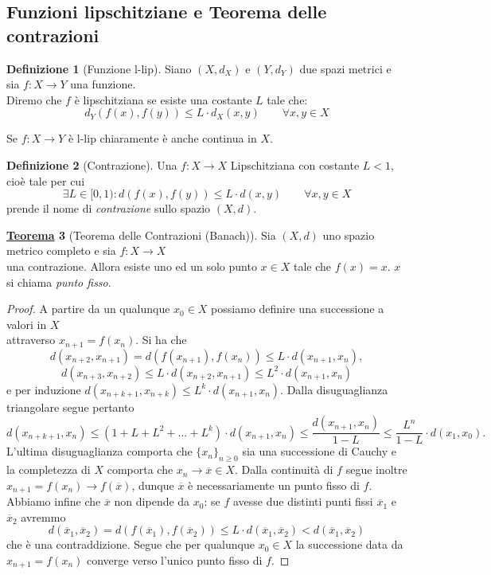 \documentclass[a4paper,twoside]{article}
\theoremstyle{definition}
\newtheorem{theorem}{\color{Red}\underline{\textrm Teorema}}
\newtheorem{definizione}[theorem]{Definizione}
\numberwithin{theorem}{section}
\begin{document}
\subsection{Funzioni lipschitziane e Teorema delle contrazioni}
\begin{definizione}[Funzione l-lip]
Siano $(X,d_X)$ e $(Y,d_Y)$ due spazi metrici e sia $f:X\to Y$ una funzione.\\ Diremo che $f$ è lipschitziana se esiste una costante $L$ tale che: $$d_Y(f(x),f(y))\leq L\cdot d_X(x,y)\qquad \forall x,y\in X$$    
\end{definizione}
Se $f:X\to Y$ è l-lip chiaramente è anche continua in $X$.
\begin{definizione}[Contrazione]
Una $f:X\to X$ Lipschitziana con costante $L<1$, cioè tale per cui
$$\exists L\in[0,1): d(f(x),f(y))\leq L\cdot d(x,y)\qquad\forall x,y\in X$$
prende il nome di \emph{contrazione} sullo spazio $(X,d)$.
\end{definizione}
\begin{theorem}[Teorema delle Contrazioni (Banach)]
Sia $(X,d)$ uno spazio metrico completo e sia $f:X\to X$\\ una contrazione. Allora esiste uno ed un solo punto $x\in X$ tale che $f(x)=x$. $x$ si chiama \emph{punto fisso}.    
\end{theorem}
\begin{proof} A partire da un qualunque $x_0\in X$ possiamo definire una successione a valori in $X$\\ attraverso $x_{n+1}=f(x_n)$. Si ha che 
$$d(x_{n+2},x_{n+1}) = d(f(x_{n+1}),f(x_n)) \leq L\cdot d(x_{n+1},x_n), $$
$$d(x_{n+3},x_{n+2}) \leq L\cdot d(x_{n+2},x_{n+1}) \leq L^2\cdot d(x_{n+1},x_n)$$
e per induzione $d(x_{n+k+1},x_{n+k})\leq L^k\cdot d(x_{n+1},x_{n})$. Dalla disuguaglianza triangolare segue pertanto 
$$ d(x_{n+k+1},x_{n}) \leq \left(1+L+L^2+\ldots+L^k\right)\cdot d(x_{n+1},x_n)\leq \frac{d(x_{n+1},x_n)}{1-L}\leq \frac{L^n}{1-L}\cdot  d(x_1,x_0).$$
L'ultima disuguaglianza comporta che $\{x_n\}_{n\geq 0}$ sia una successione di Cauchy e la completezza di $X$ comporta che $x_n\to \overline{x} \in X$. Dalla continuità di $f$ segue inoltre $x_{n+1}=f(x_n)\to f(\overline{x})$, dunque $\overline{x}$ è necessariamente un punto fisso di $f$. Abbiamo infine che $\overline{x}$ non dipende da $x_0$: se $f$ avesse due distinti punti fissi $\overline{x}_1$ e $\overline{x}_2$ avremmo 
$$ d(\overline{x}_1,\overline{x}_2) = d(f(\overline{x}_1),f(\overline{x}_2)) \leq L\cdot d(\overline{x}_1,\overline{x}_2) < d(\overline{x}_1,\overline{x}_2) $$
che è una contraddizione. Segue che per qualunque $x_0\in X$ la successione data da $x_{n+1}=f(x_n)$ converge verso l'unico punto fisso di $f$.   
\end{proof}
\end{document}
